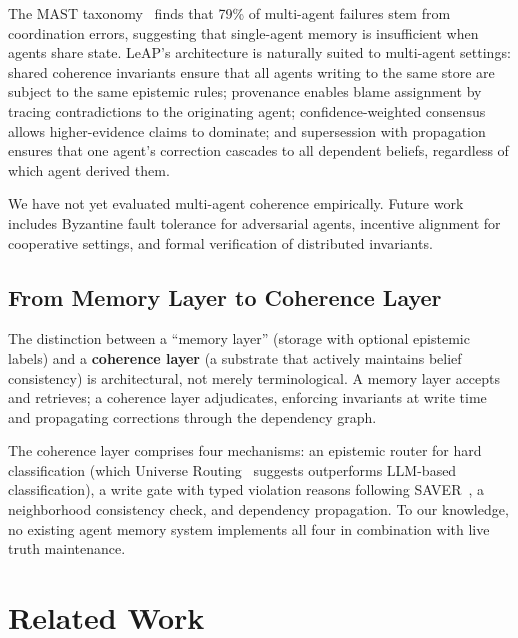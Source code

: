 \documentclass[11pt,letterpaper]{article}
\begin{document}
The MAST taxonomy~\cite{mast2025} finds that 79\% of multi-agent failures stem from coordination errors, suggesting that single-agent memory is insufficient when agents share state. LeAP's architecture is naturally suited to multi-agent settings: shared coherence invariants ensure that all agents writing to the same store are subject to the same epistemic rules; provenance enables blame assignment by tracing contradictions to the originating agent; confidence-weighted consensus allows higher-evidence claims to dominate; and supersession with propagation ensures that one agent's correction cascades to all dependent beliefs, regardless of which agent derived them.

We have not yet evaluated multi-agent coherence empirically. Future work includes Byzantine fault tolerance for adversarial agents, incentive alignment for cooperative settings, and formal verification of distributed invariants.

\subsection{From Memory Layer to Coherence Layer}

The distinction between a ``memory layer'' (storage with optional epistemic labels) and a \textbf{coherence layer} (a substrate that actively maintains belief consistency) is architectural, not merely terminological. A memory layer accepts and retrieves; a coherence layer adjudicates, enforcing invariants at write time and propagating corrections through the dependency graph.

The coherence layer comprises four mechanisms: an epistemic router for hard classification (which Universe Routing~\cite{universe2026} suggests outperforms LLM-based classification), a write gate with typed violation reasons following SAVER~\cite{yuan2026saver}, a neighborhood consistency check, and dependency propagation. To our knowledge, no existing agent memory system implements all four in combination with live truth maintenance.

\section{Related Work}
\end{document}
